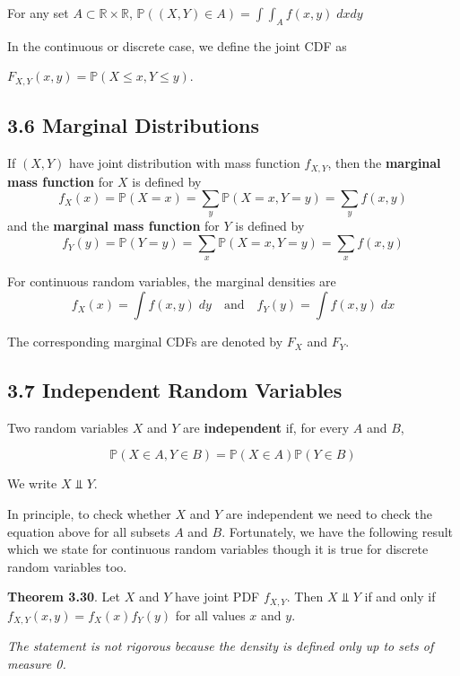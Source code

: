 For any set \(A \subset \mathbb{R} \times \mathbb{R}\), \(\mathbb{P}((X, Y) \in A) = \int \int_A f(x, y) \; dx dy\)

In the continuous or discrete case, we define the joint CDF as 

\(F_{X, Y}(x, y) = \mathbb{P}(X \leq x, Y \leq y)\).

\subsection*{3.6 Marginal Distributions}\label{marginal-distributions}

If \((X, Y)\) have joint distribution with mass function \(f_{X, Y}\), then the \textbf{marginal mass function} for \(X\) is defined by
\[
f_X(x) = \mathbb{P}(X = x) = \sum_y \mathbb{P}(X = x, Y = y) = \sum_y f(x, y)
\]
and the \textbf{marginal mass function} for \(Y\) is defined by
\[
f_Y(y) = \mathbb{P}(Y = y) = \sum_x \mathbb{P}(X = x, Y = y) = \sum_x f(x, y) 
\]

For continuous random variables, the marginal densities are
\[
f_X(x) = \int f(x, y) \; dy \quad \text{and} \quad f_Y(y) = \int f(x, y) \; dx 
\]

The corresponding marginal CDFs are denoted by \(F_X\) and \(F_Y\).

\subsection*{3.7 Independent Random Variables}\label{independent-random-variables}

Two random variables \(X\) and \(Y\) are \textbf{independent} if, for every \(A\) and \(B\),

\[ \mathbb{P}(X \in A, Y \in B) = \mathbb{P}(X \in A) \mathbb{P}(Y \in B) \]

We write \(X \text{ ⫫ } Y\).

In principle, to check whether \(X\) and \(Y\) are independent we need to check the equation above for all subsets \(A\) and \(B\). Fortunately, we have the following result which we state for continuous random variables though it is true for discrete random variables too.

\textbf{Theorem 3.30}. Let \(X\) and \(Y\) have joint PDF \(f_{X, Y}\). Then \(X \text{ ⫫ } Y\) if and only if \(f_{X, Y}(x, y) = f_X(x) f_Y(y)\) for all values \(x\) and \(y\).

\emph{The statement is not rigorous because the density is defined only up to sets of measure 0.}

